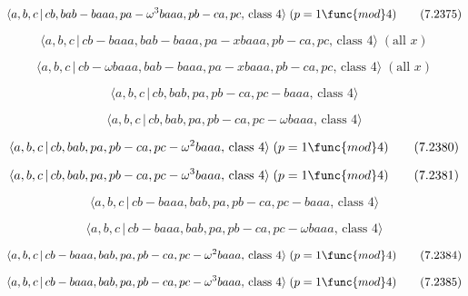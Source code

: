 \documentclass[10pt]{article}
\begin{document}
\begin{equation}
\langle a,b,c\,|\,cb,bab-baaa,pa-\omega ^{3}baaa,pb-ca,pc,\,\text{class }%
4\rangle \;(p=1\func{mod}4)  \tag{7.2375}
\end{equation}

\begin{equation}
\langle a,b,c\,|\,cb-baaa,bab-baaa,pa-xbaaa,pb-ca,pc,\,\text{class }4\rangle
\;(\text{all }x)  \tag{7.2376}
\end{equation}

\begin{equation}
\langle a,b,c\,|\,cb-\omega baaa,bab-baaa,pa-xbaaa,pb-ca,pc,\,\text{class }%
4\rangle \;(\text{all }x)  \tag{7.2377}
\end{equation}

\begin{equation}
\langle a,b,c\,|\,cb,bab,pa,pb-ca,pc-baaa,\,\text{class }4\rangle 
\tag{7.2378}
\end{equation}

\begin{equation}
\langle a,b,c\,|\,cb,bab,pa,pb-ca,pc-\omega baaa,\,\text{class }4\rangle 
\tag{7.2379}
\end{equation}

\begin{equation}
\langle a,b,c\,|\,cb,bab,pa,pb-ca,pc-\omega ^{2}baaa,\,\text{class }4\rangle
\;(p=1\func{mod}4)  \tag{7.2380}
\end{equation}

\begin{equation}
\langle a,b,c\,|\,cb,bab,pa,pb-ca,pc-\omega ^{3}baaa,\,\text{class }4\rangle
\;(p=1\func{mod}4)  \tag{7.2381}
\end{equation}

\begin{equation}
\langle a,b,c\,|\,cb-baaa,bab,pa,pb-ca,pc-baaa,\,\text{class }4\rangle 
\tag{7.2382}
\end{equation}

\begin{equation}
\langle a,b,c\,|\,cb-baaa,bab,pa,pb-ca,pc-\omega baaa,\,\text{class }4\rangle
\tag{7.2383}
\end{equation}

\begin{equation}
\langle a,b,c\,|\,cb-baaa,bab,pa,pb-ca,pc-\omega ^{2}baaa,\,\text{class }%
4\rangle \;(p=1\func{mod}4)  \tag{7.2384}
\end{equation}

\begin{equation}
\langle a,b,c\,|\,cb-baaa,bab,pa,pb-ca,pc-\omega ^{3}baaa,\,\text{class }%
4\rangle \;(p=1\func{mod}4)  \tag{7.2385}
\end{equation}
\end{document}

